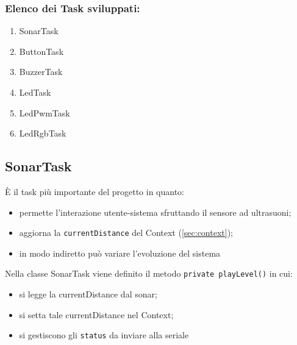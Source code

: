 \subsubsection{Elenco dei Task sviluppati:}
\begin{enumerate}
	\item SonarTask
	\item ButtonTask
	\item BuzzerTask
	\item LedTask
	\item LedPwmTask
	\item LedRgbTask
\end{enumerate}

\subsection{SonarTask}
È il task più importante del progetto in quanto:
\begin{itemize}
	\item permette l'interazione utente-sistema sfruttando il sensore ad ultrasuoni;
	\item aggiorna la \texttt{currentDistance} del Context (\ref{sec:context});
	\item in modo indiretto può variare l'evoluzione del sistema
\end{itemize}
Nella classe SonarTask viene definito il metodo \texttt{private playLevel()} in cui:
\begin{itemize}
	\item si legge la currentDistance dal sonar;
	\item si setta tale currentDistance nel Context;
	\item si gestiscono gli \texttt{status} da inviare alla seriale
\end{itemize}

